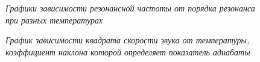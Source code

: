 \documentclass[a4paper, fontsize = 14pt]{article}
\begin{document}
\begin{figure}[]
\caption{\textit{Графики зависимости резонансной частоты от порядка резонанса при разных температурах}}
\end{figure}

\begin{figure}[]
\caption{\textit{График зависимости квадрата скорости звука от температуры, коэффициент наклона которой определяет показатель адиабаты}}
\end{figure}
\end{document}
